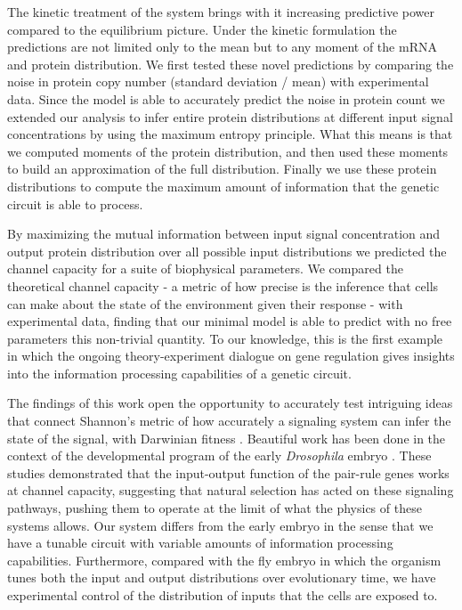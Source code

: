 The kinetic treatment of the system brings with it increasing predictive power
compared to the equilibrium picture. Under the kinetic formulation the
predictions are not limited only to the mean but to any moment of the mRNA and
protein distribution. We first tested these novel predictions by comparing the
noise in protein copy number (standard deviation / mean) with experimental data.
Since the model is able to accurately predict the noise in protein count we
extended our analysis to infer entire protein distributions at different input
signal concentrations by using the maximum entropy principle. What this means is
that we computed moments of the protein distribution, and then used these
moments to build an approximation of the full distribution. Finally we use these
protein distributions to compute the maximum amount of information that the
genetic circuit is able to process.

By maximizing the mutual information between input signal concentration and
output protein distribution over all possible input distributions we predicted
the channel capacity for a suite of biophysical parameters. We compared the
theoretical  channel capacity - a metric of how precise is the inference that
cells can make about the state of the environment given their response - with
experimental data, finding that our minimal model is able to predict with no
free parameters this non-trivial quantity. To our knowledge, this is the first
example in which the ongoing theory-experiment dialogue on gene regulation gives
insights into the  information processing capabilities of a genetic circuit.

The findings of this work open the opportunity to accurately test intriguing
ideas that connect Shannon's metric of how accurately a signaling system can
infer the state of the signal, with Darwinian fitness \cite{Taylor2007a}.
Beautiful work has been done in the context of the developmental program of the
early {\it Drosophila} embryo \cite{Tkacik2008, Petkova2016}. These studies
demonstrated that the input-output function of the pair-rule genes works at
channel capacity, suggesting that natural selection has acted on these signaling
pathways, pushing them to operate at the limit of what the physics of these
systems allows. Our system differs from the early embryo in the sense that we
have a tunable circuit with variable amounts of information processing
capabilities. Furthermore, compared with the fly embryo in which the organism
tunes both the input and output distributions over evolutionary time, we have
experimental control of the distribution of inputs that the cells are exposed
to.
